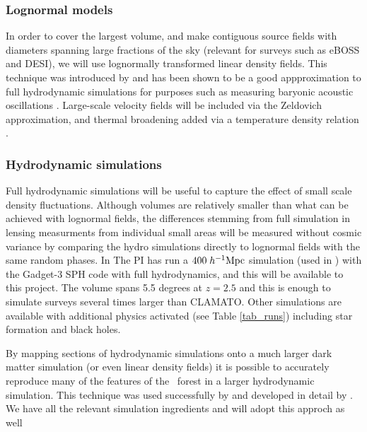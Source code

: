 \subsubsection{Lognormal models}
In order to cover the largest volume, and make contiguous source
fields with diameters spanning large fractions of the sky (relevant for
surveys such as eBOSS and DESI), we will use lognormally transformed
linear density fields. This technique was introduced by \cite{bi1997}
and has been shown to be a good appproximation to full hydrodynamic
simulations for purposes such as measuring baryonic acoustic oscillations
\cite{legoff}. Large-scale velocity fields will be included via the
Zeldovich approximation, and thermal broadening added via a temperature
density relation \cite{keating17}.

\subsubsection{Hydrodynamic simulations}
Full hydrodynamic simulations will be useful to capture the effect of
small scale density fluctuations.
 Although volumes are relatively smaller
than what can be achieved with lognormal fields, the differences stemming
from
full simulation  in
lensing measurments from individual small areas will be measured without
cosmic variance by comparing the hydro simulations directly to lognormal
fields with the same random phases. In 
The PI has run  a $400\;h^{-1}{\rm Mpc}$ simulation 
(used in \cite{cisewski}) 
 with 
the Gadget-3 SPH code with full hydrodynamics, and this will be available to
this project. The volume spans 5.5 degrees at $z=2.5$ and this is enough
to simulate surveys several times larger than CLAMATO. Other
simulations are available with additional physics activated (see Table 
\ref{tab_runs})
including star formation and black holes.

By mapping sections of hydrodynamic simulations onto a much larger
dark matter simulation (or even linear density fields) it is possible
to accurately reproduce many of the features of the \lya\ forest
in a larger hydrodynamic simulation. This
technique was used successfully by \cite{croft2004} and developed in
detail by \cite{peirani2014}. We have all the relevant 
simulation ingredients and will adopt this approch as well

